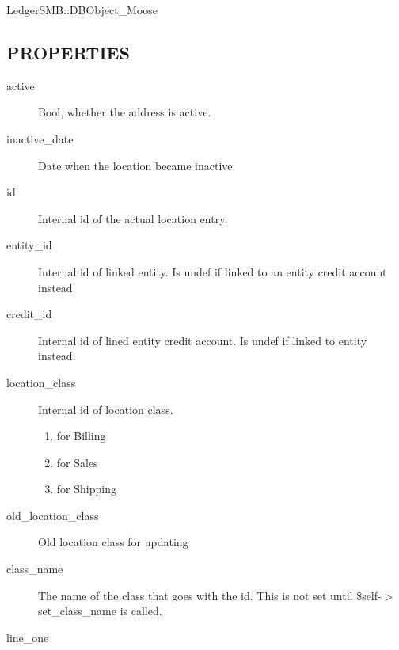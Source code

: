 \begin{description}
\begin{description}
\begin{description}
\begin{description}
\begin{description}
\begin{description}
\begin{description}
\begin{description}
\begin{description}
\item[{LedgerSMB::DBObject\_Moose}] \mbox{}\end{description}
\subsection*{PROPERTIES\label{LedgerSMB::DBObject::Entity::Location_PROPERTIES}}
\begin{description}

\item[{active}] \mbox{}

Bool, whether the address is active.


\item[{inactive\_date}] \mbox{}

Date when the location became inactive.


\item[{id}] \mbox{}

Internal id of the actual location entry.


\item[{entity\_id}] \mbox{}

Internal id of linked entity.  Is undef if linked to an entity credit account 
instead


\item[{credit\_id}] \mbox{}

Internal id of lined entity credit account.  Is undef if linked to entity
instead.


\item[{location\_class}] \mbox{}

Internal id of location class.

\begin{enumerate}

\item for Billing
\item for Sales
\item for Shipping\end{enumerate}

\item[{old\_location\_class}] \mbox{}

Old location class for updating


\item[{class\_name}] \mbox{}

The name of the class that goes with the id.  This is not set until
\$self-$>$set\_class\_name is called.


\item[{line\_one}] \mbox{}


\end{description}
\end{description}
\end{description}
\end{description}
\end{description}
\end{description}
\end{description}
\end{description}
\end{description}
